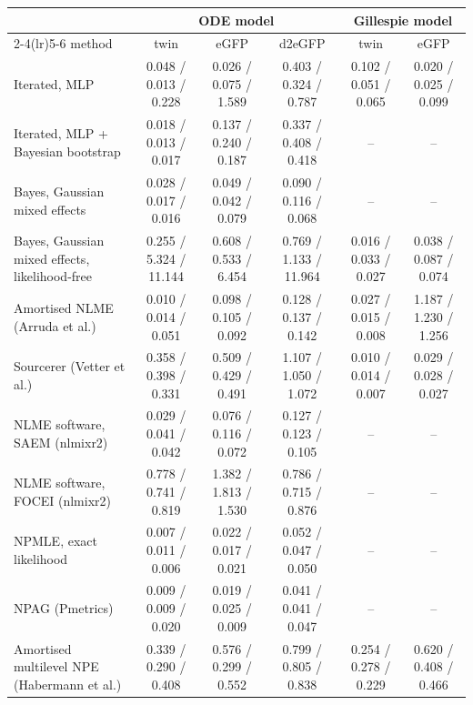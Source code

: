 \begin{tabular}{lccccc}
\toprule
 & \multicolumn{3}{c}{ODE model} & \multicolumn{2}{c}{Gillespie model} \\
\cmidrule(lr){2-4}\cmidrule(lr){5-6}
method & twin & eGFP & d2eGFP & twin & eGFP \\
\midrule
Iterated, MLP & 0.048 / 0.013 / 0.228 & 0.026 / 0.075 / 1.589 & 0.403 / 0.324 / 0.787 & 0.102 / 0.051 / 0.065 & 0.020 / 0.025 / 0.099 \\
Iterated, MLP + Bayesian bootstrap & 0.018 / 0.013 / 0.017 & 0.137 / 0.240 / 0.187 & 0.337 / 0.408 / 0.418 & -- & -- \\
Bayes, Gaussian mixed effects & 0.028 / 0.017 / 0.016 & 0.049 / 0.042 / 0.079 & 0.090 / 0.116 / 0.068 & -- & -- \\
Bayes, Gaussian mixed effects, likelihood-free & 0.255 / 5.324 / 11.144 & 0.608 / 0.533 / 6.454 & 0.769 / 1.133 / 11.964 & 0.016 / 0.033 / 0.027 & 0.038 / 0.087 / 0.074 \\
Amortised NLME (Arruda et al.) & 0.010 / 0.014 / 0.051 & 0.098 / 0.105 / 0.092 & 0.128 / 0.137 / 0.142 & 0.027 / 0.015 / 0.008 & 1.187 / 1.230 / 1.256 \\
Sourcerer (Vetter et al.) & 0.358 / 0.398 / 0.331 & 0.509 / 0.429 / 0.491 & 1.107 / 1.050 / 1.072 & 0.010 / 0.014 / 0.007 & 0.029 / 0.028 / 0.027 \\
NLME software, SAEM (nlmixr2) & 0.029 / 0.041 / 0.042 & 0.076 / 0.116 / 0.072 & 0.127 / 0.123 / 0.105 & -- & -- \\
NLME software, FOCEI (nlmixr2) & 0.778 / 0.741 / 0.819 & 1.382 / 1.813 / 1.530 & 0.786 / 0.715 / 0.876 & -- & -- \\
NPMLE, exact likelihood & 0.007 / 0.011 / 0.006 & 0.022 / 0.017 / 0.021 & 0.052 / 0.047 / 0.050 & -- & -- \\
NPAG (Pmetrics) & 0.009 / 0.009 / 0.020 & 0.019 / 0.025 / 0.009 & 0.041 / 0.041 / 0.047 & -- & -- \\
Amortised multilevel NPE (Habermann et al.) & 0.339 / 0.290 / 0.408 & 0.576 / 0.299 / 0.552 & 0.799 / 0.805 / 0.838 & 0.254 / 0.278 / 0.229 & 0.620 / 0.408 / 0.466 \\
\bottomrule
\end{tabular}
